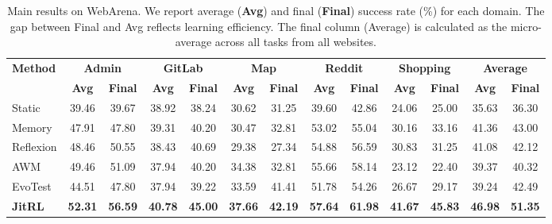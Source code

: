 \begin{table}[t]
  \caption{Main results on WebArena. We report average (\textbf{Avg}) and final (\textbf{Final}) success rate (\%) for each domain. The gap between Final and Avg reflects learning efficiency. The final column (Average) is calculated as the micro-average across all tasks from all websites.}
  \vskip -0.1in
  \label{tab:main_results}
  \begin{center}
    \begin{small}
        \begin{adjustbox}{width=\textwidth}
        \begin{tabular}{lcccccccccccc}
          \toprule
          \multirow{2}{*}{\textbf{Method}} & \multicolumn{2}{c}{\textbf{Admin}} & \multicolumn{2}{c}{\textbf{GitLab}} & \multicolumn{2}{c}{\textbf{Map}} & \multicolumn{2}{c}{\textbf{Reddit}} & \multicolumn{2}{c}{\textbf{Shopping}} & \multicolumn{2}{c}{\textbf{Average}} \\
          & \textbf{Avg} & \textbf{Final}
          & \textbf{Avg} & \textbf{Final}
          & \textbf{Avg} & \textbf{Final}
          & \textbf{Avg} & \textbf{Final}
          & \textbf{Avg} & \textbf{Final}
          & \textbf{Avg} & \textbf{Final}\\
          \midrule
          Static & 39.46 & 39.67 & 38.92 & 38.24 & 30.62 & 31.25 & 39.60 & 42.86 & 24.06 & 25.00 & 35.63 & 36.30 \\
          Memory & 47.91 & 47.80 & 39.31 & 40.20 & 30.47 & 32.81 & 53.02 & 55.04 & 30.16 & 33.16 & 41.36 & 43.00 \\
          Reflexion & 48.46 & 50.55 & 38.43 & 40.69 & 29.38 & 27.34 & 54.88 & 56.59 & 30.83 & 31.25 & 41.08 & 42.12 \\
          AWM & 49.46 & 51.09 & 37.94 & 40.20 & 34.38 & 32.81 & 55.66 & 58.14 & 23.12 & 22.40 & 39.37 & 40.32 \\
          EvoTest & 44.51 & 47.80 & 37.94 & 39.22 & 33.59 & 41.41 & 51.78 & 54.26 & 26.67 & 29.17 & 39.24 & 42.49 \\
          \midrule
          \textbf{JitRL} & \textbf{52.31} & \textbf{56.59} & \textbf{40.78} & \textbf{45.00} & \textbf{37.66} & \textbf{42.19} & \textbf{57.64} & \textbf{61.98} & \textbf{41.67} & \textbf{45.83} & \textbf{46.98} & \textbf{51.35} \\
          \bottomrule
        \end{tabular}
        \vspace{-6mm}
        \end{adjustbox}
    \end{small}
  \end{center}
\end{table}



